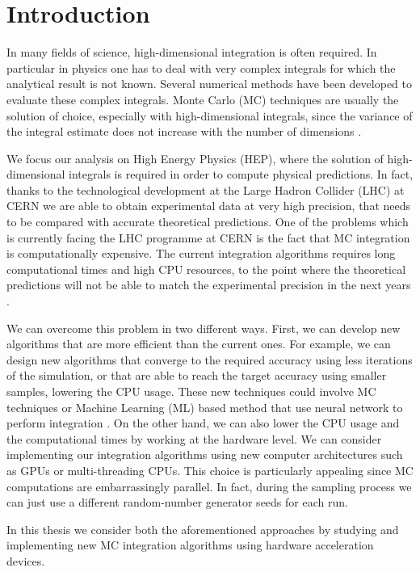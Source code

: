 \documentclass[../main/main.tex]{subfiles}
\begin{document}
\chapter*{Introduction}

In many fields of science, high-dimensional integration is often required. In particular in physics one has to deal with very complex integrals for which the analytical result is not known. Several numerical methods have been developed to evaluate these complex integrals. Monte Carlo (MC) techniques are usually the solution of choice, especially with high-dimensional integrals, since the variance of the integral estimate does not increase with the number of dimensions \cite{Press:1992zz}.

We focus our analysis on High Energy Physics (HEP), where the solution of high-dimensional integrals is required in order to compute physical predictions. In fact, thanks to the technological development at the Large Hadron Collider (LHC) at CERN we are able to obtain experimental data at very high precision, that needs to be compared with accurate theoretical predictions.
One of the problems which is currently facing the LHC programme at CERN \cite{Dainese:2703572} is the fact that MC integration is computationally expensive. The current integration algorithms requires long computational times  and high CPU resources, to the point where the theoretical predictions will not be able to match the experimental precision in the next years \cite{Buckley:2019wov, Apollinari:2017cqg, Abada:2019zxq}.

We can overcome this problem in two different ways. First, we can develop new algorithms that are more efficient than the current ones. For example, we can design new algorithms that converge to the required accuracy using less iterations of the simulation, or that are able to reach the target accuracy using smaller samples, lowering the CPU usage. These new techniques could involve MC techniques or Machine Learning (ML) based method that use neural network to perform integration \cite{Bendavid:2017zhk}.
On the other hand, we can also lower the CPU usage and the computational times  by working at the hardware level.
We can consider implementing our integration algorithms using new computer architectures such as GPUs or multi-threading CPUs. This choice is particularly appealing since MC computations are embarrassingly parallel. In fact, during the sampling process we can just use a different random-number generator seeds for each run.

In this thesis we consider both the aforementioned approaches by studying and implementing new MC integration algorithms using hardware acceleration devices.
\end{document}
